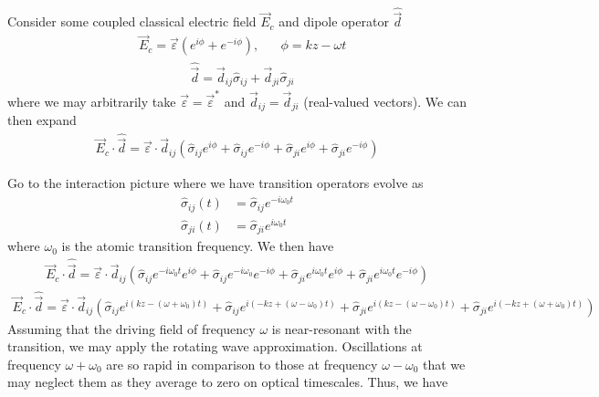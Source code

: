 \documentclass[aps,pra,showpacs,amsmath,amssymb,nofootinbib,longbibliography,superscriptaddress
]{revtex4-1}
\theoremstyle{definition}
\theoremstyle{remark}
\newcommand{\0}{\hat{0}}
\begin{document}
Consider some coupled classical electric field $\vec{E}_c$ and dipole operator $\hat{\vec{d}}$
\begin{align}
    &\vec{E}_c = \vec{\varepsilon} (e^{i\phi} + e^{-i\phi}),\;\;\;\;\;\;\phi = kz - \omega t
\end{align}
\begin{align}
    &\hat{\vec{d}} = \vec{d}_{ij} \hat{\sigma}_{ij} + \vec{d}_{ji} \hat{\sigma}_{ji}
\end{align}
where we may arbitrarily take $\vec{\varepsilon} = \vec{\varepsilon}^*$ and $\vec{d}_{ij} = \vec{d}_{ji}$ (real-valued vectors). We can then expand
\begin{align}
    \vec{E}_c \cdot \hat{\vec{d}} = \vec{\varepsilon} \cdot \vec{d}_{ij} \left(\hat{\sigma}_{ij} e^{i\phi} + \hat{\sigma}_{ij} e^{-i\phi} + \hat{\sigma}_{ji} e^{i\phi} + \hat{\sigma}_{ji} e^{-i\phi}\right)
\end{align}

Go to the interaction picture where we have transition operators evolve as
\begin{align}
    \hat{\sigma}_{ij}(t) &= \hat{\sigma}_{ij} e^{-i \omega_0 t}\\
    \hat{\sigma}_{ji}(t) &= \hat{\sigma}_{ji} e^{i \omega_0 t}
\end{align}
where $\omega_0$ is the atomic transition frequency. We then have
\begin{align*}
    \vec{E}_c \cdot \hat{\vec{d}} = \vec{\varepsilon} \cdot \vec{d}_{ij} \left(
        \hat{\sigma}_{ij} e^{-i \omega_0 t} e^{i\phi} +
        \hat{\sigma}_{ij} e^{-i \omega_0 } e^{-i\phi} +
        \hat{\sigma}_{ji} e^{i \omega_0 t} e^{i\phi} +
        \hat{\sigma}_{ji} e^{i \omega_0 t} e^{-i\phi}
    \right)
\end{align*}
\begin{align}
    \vec{E}_c \cdot \hat{\vec{d}} = 
    \vec{\varepsilon} \cdot \vec{d}_{ij} \left(
        \hat{\sigma}_{ij}e^{i(kz - (\omega + \omega_0)t)} +
        \hat{\sigma}_{ij} e^{i(-kz + (\omega - \omega_0) t)} +
        \hat{\sigma}_{ji} e^{i(kz - (\omega - \omega_0) t)} +
        \hat{\sigma}_{ji} e^{i(-kz + (\omega + \omega_0) t)}
    \right)
\end{align}
Assuming that the driving field of frequency $\omega$ is near-resonant with the transition, we may apply the rotating wave approximation. Oscillations at frequency $\omega + \omega_0$ are so rapid in comparison to those at frequency $\omega - \omega_0$ that we may neglect them as they average to zero on optical timescales. Thus, we have
\end{document}
